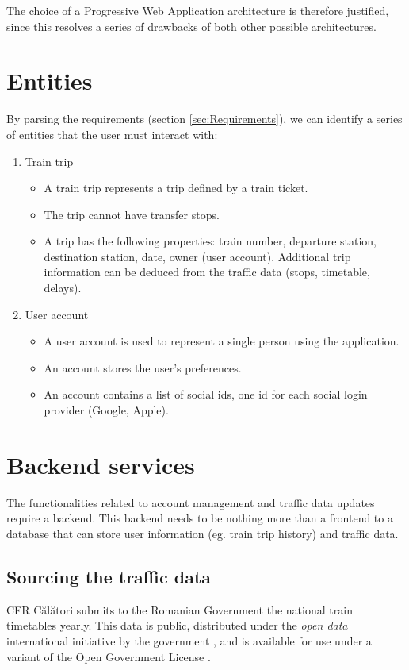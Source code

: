 The choice of a Progressive Web Application architecture is therefore justified, since this resolves a series of drawbacks of both other possible architectures.

\section{Entities}
By parsing the requirements (section \ref{sec:Requirements}), we can identify a series of entities that the user must interact with:

\begin{enumerate}
    \item Train trip
          \begin{itemize}
              \item A train trip represents a trip defined by a train ticket.
              \item The trip cannot have transfer stops.
              \item A trip has the following properties: train number, departure station, destination station, date, owner (user account). Additional trip information can be deduced from the traffic data (stops, timetable, delays).
          \end{itemize}
    \item User account
          \begin{itemize}
              \item A user account is used to represent a single person using the application.
              \item An account stores the user's preferences.
              \item An account contains a list of social ids, one id for each social login provi\-der (Google, Apple).
          \end{itemize}
\end{enumerate}

\section{Backend services}
The functionalities related to account management and traffic data updates require a backend. This backend needs to be nothing more than a frontend to a database that can store user information (eg. train trip history) and traffic data.

\subsection{Sourcing the traffic data}
CFR Călători submits to the Romanian Government the national train timetables yearly. This data is public, distributed under the \textit{open data} international initiative by the government \cite{DataGovRoDespre}, and is available for use under a variant of the Open Government License \cite{DataGovRoLicense}.


